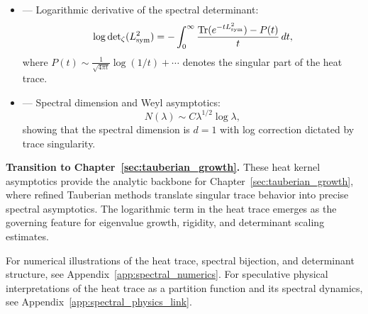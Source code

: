 \begin{itemize}
  \item {} — Logarithmic derivative of the spectral determinant:
  \[
  \log \det\nolimits_{\zeta}(L_{\mathrm{sym}}^2)
  = -\int_0^\infty \frac{\operatorname{Tr}(e^{-t L_{\mathrm{sym}}^2}) - P(t)}{t} \, dt,
  \]
  where \( P(t) \sim \frac{1}{\sqrt{4\pi t}} \log(1/t) + \cdots \) denotes the singular part of the heat trace.

  \item {} — Spectral dimension and Weyl asymptotics:
  \[
  N(\lambda) \sim C \lambda^{1/2} \log \lambda,
  \]
  showing that the spectral dimension is \( d = 1 \) with log correction dictated by trace singularity.
\end{itemize}

\medskip

\noindent\textbf{Transition to Chapter~\ref{sec:tauberian_growth}.}  
These heat kernel asymptotics provide the analytic backbone for Chapter~\ref{sec:tauberian_growth}, where refined Tauberian methods translate singular trace behavior into precise spectral asymptotics. The logarithmic term in the heat trace emerges as the governing feature for eigenvalue growth, rigidity, and determinant scaling estimates.

\medskip
\noindent
For numerical illustrations of the heat trace, spectral bijection, and determinant structure, see Appendix~\ref{app:spectral_numerics}. For speculative physical interpretations of the heat trace as a partition function and its spectral dynamics, see Appendix~\ref{app:spectral_physics_link}.
